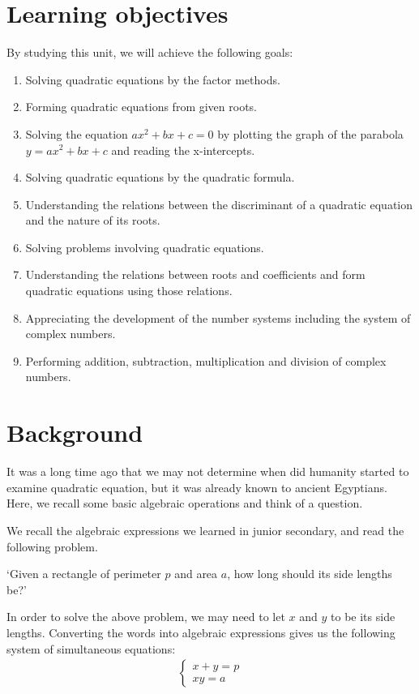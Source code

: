 \documentclass[12pt]{article}
\begin{document}
    \section*{Learning objectives}
    By studying this unit, we will achieve the following goals:
    \begin{enumerate}
        \item Solving quadratic equations by the factor methods.
        \item Forming quadratic equations from given roots.
        \item Solving the equation $ax^2+bx+c=0$ by plotting the graph of the parabola $y=ax^2+bx+c$ and reading the x-intercepts.
        \item Solving quadratic equations by the quadratic formula.
        \item Understanding the relations between the discriminant of a quadratic equation and the nature of its roots.
        \item Solving problems involving quadratic equations.
        \item Understanding the relations between roots and coefficients and form quadratic equations using those relations.
        \item Appreciating the development of the number systems including the system of complex numbers.
        \item Performing addition, subtraction, multiplication and division of complex numbers.
    \end{enumerate}
    \section*{Background}
    It was a long time ago that we may not determine when did humanity started to examine quadratic equation, but it was already known to ancient Egyptians. Here, we recall some basic algebraic operations and think of a question.

    We recall the algebraic expressions we learned in junior secondary, and read the following problem.
    
    `Given a rectangle of perimeter $p$ and area $a$, how long should its side lengths be?'

    In order to solve the above problem, we may need to let $x$ and $y$ to be its side lengths. Converting the words into algebraic expressions gives us the following system of simultaneous equations:
    \begin{align*}
        \begin{cases}
            x+y=p\\xy=a
        \end{cases}
    \end{align*}
    
\end{document}
